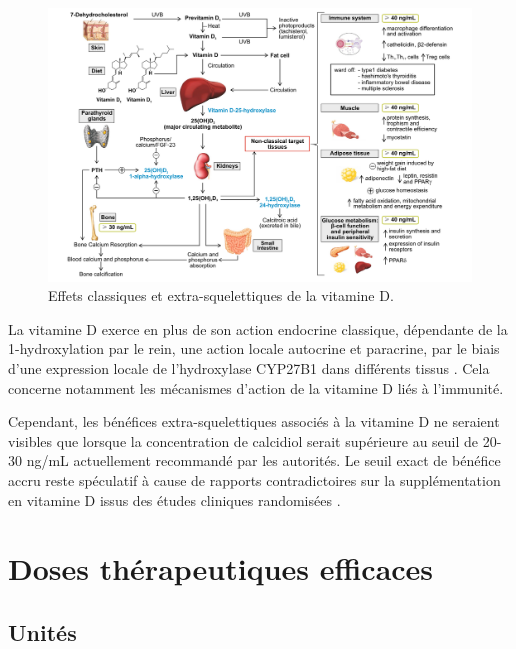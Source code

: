 \documentclass[
  a4paper,
  DIV=11,
  numbers=noendperiod,
  listof=totoc]{scrreprt}
\begin{document}
\begin{landscape}
\begin{figure}
\includegraphics{figures/extra-skeletal-effect.png} 
\caption[Effets classiques et extra-squelettiques de la vitamine D.]
{Effets classiques et extra-squelettiques de la vitamine D. \textcite{Caprio.2017}}
\label{fig:extra-skeletal}
\end{figure}
\end{landscape}

La vitamine D exerce en plus de son action endocrine classique,
dépendante de la 1-hydroxylation par le rein, une action locale
autocrine et paracrine, par le biais d'une expression locale de
l'hydroxylase \ac{CYP27B1} dans différents tissus
\autocite{Carmeliet.2015,Cannell.2008}. Cela concerne notamment les
mécanismes d'action de la vitamine D liés à l'immunité.

Cependant, les bénéfices extra-squelettiques associés à la vitamine D ne
seraient visibles que lorsque la concentration de calcidiol serait
supérieure au seuil de 20-30 ng/mL actuellement recommandé par les
autorités. Le seuil exact de bénéfice accru reste spéculatif à cause de
rapports contradictoires sur la supplémentation en vitamine D issus des
études cliniques randomisées \autocites[ ]{Caprio.2017}[
]{Lewis.2015}{Bouillon.2013,Rejnmark.2017}.

\section{Doses thérapeutiques
efficaces}\label{doses-thuxe9rapeutiques-efficaces}

\subsection{Unités}\label{unituxe9s}
\end{document}
